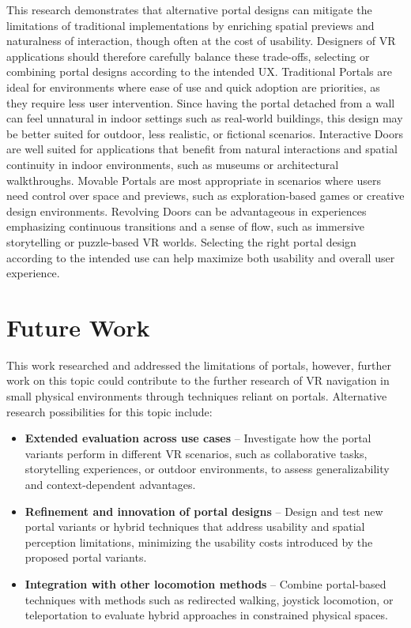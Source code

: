 This research demonstrates that alternative portal designs can mitigate the limitations of traditional implementations by 
enriching spatial previews and naturalness of interaction, though often at the cost of usability. Designers of VR applications should 
therefore carefully balance these trade-offs, selecting or combining portal designs according to the intended \gls{UX}. Traditional Portals 
are ideal for environments where ease of use and quick adoption are priorities, as they require less user intervention.
Since having the portal detached from a wall can feel unnatural in indoor settings such as real-world buildings, this design may be
better suited for outdoor, less realistic, or fictional scenarios. Interactive Doors are well suited for applications that benefit from
natural interactions and spatial continuity in indoor environments, such as museums or architectural walkthroughs. Movable Portals
are most appropriate in scenarios where users need control over space and previews, such as exploration-based games or creative
design environments. Revolving Doors can be advantageous in experiences emphasizing continuous transitions and a sense of flow,
such as immersive storytelling or puzzle-based VR worlds. Selecting the right portal design according to the intended use can help
maximize both usability and overall user experience. 


\section{Future Work}
\label{sec:future-work}

This work researched and addressed the limitations of portals, however, further work on this topic could contribute to the further research of 
\gls{VR} navigation in small physical environments through  techniques reliant on portals.
Alternative research possibilities for this topic include:

\begin{itemize}
    \item \textbf{Extended evaluation across use cases} -- Investigate how the portal variants perform in different \gls{VR} scenarios, 
    such as collaborative tasks, storytelling experiences, or outdoor environments, to assess generalizability and context-dependent 
    advantages.

    \item \textbf{Refinement and innovation of portal designs} -- Design and test new portal variants or hybrid techniques that 
    address usability and spatial perception limitations, minimizing the usability costs introduced by the proposed portal variants.

    \item \textbf{Integration with other locomotion methods} -- Combine portal-based techniques with methods such as redirected walking,
    joystick locomotion, or teleportation to evaluate hybrid approaches in constrained physical spaces.

\end{itemize}


